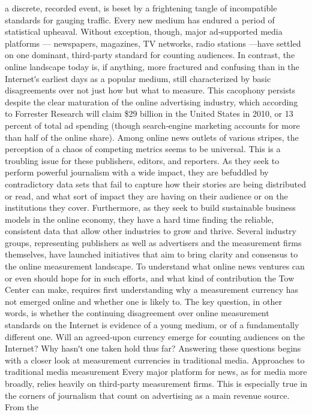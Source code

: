 a discrete, recorded event, is beset by a frightening tangle of incompatible
standards for gauging traffic.
Every new medium has endured a period of statistical upheaval. Without
exception, though, major ad‐supported media platforms — newspapers,
magazines, TV networks, radio stations —have settled on one dominant,
third‐party standard for counting audiences. In contrast, the online
landscape today is, if anything, more fractured and confusing than in the
Internetʹs earliest days as a popular medium, still characterized by basic
disagreements over not just how but what to measure. This cacophony
persists despite the clear maturation of the online advertising industry,
which according to Forrester Research will claim \$29 billion in the United
States in 2010, or 13 percent of total ad spending (though search‐engine
marketing accounts for more than half of the online share).
Among online news outlets of various stripes, the perception of a chaos of
competing metrics seems to be universal. This is a troubling issue for these
publishers, editors, and reporters. As they seek to perform powerful
journalism with a wide impact, they are befuddled by contradictory data
sets that fail to capture how their stories are being distributed or read, and
what sort of impact they are having on their audience or on the
institutions they cover. Furthermore, as they seek to build sustainable
business models in the online economy, they have a hard time finding the
reliable, consistent data that allow other industries to grow and thrive.
Several industry groups, representing publishers as well as advertisers
and the measurement firms themselves, have launched initiatives that aim
to bring clarity and consensus to the online measurement landscape. To
understand what online news ventures can or even should hope for in
such efforts, and what kind of contribution the Tow Center can make,
requires first understanding why a measurement currency has not
emerged online and whether one is likely to.
The key question, in other words, is whether the continuing disagreement
over online measurement standards on the Internet is evidence of a young
medium, or of a fundamentally different one. Will an agreed‐upon
currency emerge for counting audiences on the Internet? Why hasnʹt one
taken hold thus far? Answering these questions begins with a closer look
at measurement currencies in traditional media.
Approaches to traditional media measurement
Every major platform for news, as for media more broadly, relies heavily
on third‐party measurement firms. This is especially true in the corners of
journalism that count on advertising as a main revenue source. From the
